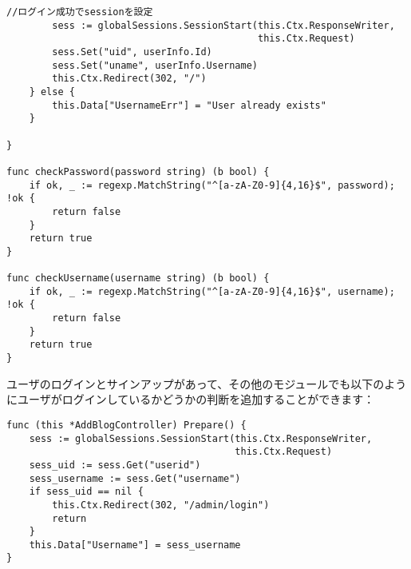 \begin{lstlisting}[numbers=none]
        //ログイン成功でsessionを設定
        sess := globalSessions.SessionStart(this.Ctx.ResponseWriter,
                                            this.Ctx.Request)
        sess.Set("uid", userInfo.Id)
        sess.Set("uname", userInfo.Username)
        this.Ctx.Redirect(302, "/")
    } else {
        this.Data["UsernameErr"] = "User already exists"
    }

}

func checkPassword(password string) (b bool) {
    if ok, _ := regexp.MatchString("^[a-zA-Z0-9]{4,16}$", password); !ok {
        return false
    }
    return true
}

func checkUsername(username string) (b bool) {
    if ok, _ := regexp.MatchString("^[a-zA-Z0-9]{4,16}$", username); !ok {
        return false
    }
    return true
}
\end{lstlisting}

ユーザのログインとサインアップがあって、その他のモジュールでも以下のようにユーザがログインしているかどうかの判断を追加することができます：

\begin{lstlisting}[numbers=none]
func (this *AddBlogController) Prepare() {
    sess := globalSessions.SessionStart(this.Ctx.ResponseWriter,
                                        this.Ctx.Request)
    sess_uid := sess.Get("userid")
    sess_username := sess.Get("username")
    if sess_uid == nil {
        this.Ctx.Redirect(302, "/admin/login")
        return
    }
    this.Data["Username"] = sess_username
}
\end{lstlisting}
